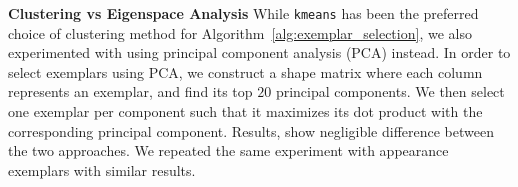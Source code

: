 \textbf{Clustering vs Eigenspace Analysis}
\label{subsec:clustering_vs_eigenspace}
While {\tt kmeans} has been the preferred choice of clustering method for
Algorithm~\ref{alg:exemplar_selection}, we also experimented with using principal component
analysis (PCA) instead. In order to select exemplars using PCA, we construct a shape matrix
where each column represents an exemplar, and find its top $20$ principal components. We then
select one exemplar per component such that it maximizes its dot product with the corresponding
principal component. Results, show negligible difference
between the two approaches. We repeated the same experiment with appearance exemplars with similar
results.
% 
